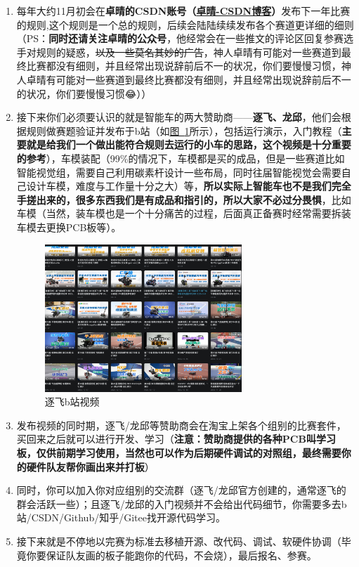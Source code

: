 \documentclass[a4paper,12pt]{article}
\newcommand{\emoji}[1]{{\EmojiFont #1}}
\begin{document}
\begin{enumerate}
    \item 每年大约11月初会在\textbf{卓晴的CSDN账号（\href{https://zhuoqing.blog.csdn.net/}{卓晴-CSDN博客}）}发布下一年比赛的规则,这个规则是一个总的规则，后续会陆陆续续发布各个赛道更详细的细则（PS：\textbf{同时还请关注卓晴的公众号}，他经常会在一些推文的评论区回复参赛选手对规则的疑惑，\sout{以及一些莫名其妙的广告}，神人卓晴有可能对一些赛道到最终比赛都没有细则，并且经常出现说辞前后不一的状况，你们要慢慢习惯，神人卓晴有可能对一些赛道到最终比赛都没有细则，并且经常出现说辞前后不一的状况，你们要慢慢习惯\emoji{😂}））

    \item 接下来你们必须要认识的就是智能车的两大赞助商——\textbf{逐飞、龙邱}，他们会根据规则做赛题验证并发布于b站（如\hyperref[fig:seekfree-bilibili]{图~\ref*{fig:seekfree-bilibili}}所示），包括运行演示，入门教程（\textbf{主要就是给我们一个做出能符合规则去运行的小车的思路，这个视频是十分重要的参考}），车模装配（99\%的情况下，车模都是买的成品，但是一些赛道比如智能视觉组，需要自己利用碳素杆设计一些布局，同时往届智能视觉会需要自己设计车模，难度与工作量十分之大）等，\textbf{所以实际上智能车也不是我们完全手搓出来的，很多东西我们是有成品和指引的，所以大家不必过分畏惧}，比如车模（当然，装车模也是一个十分痛苦的过程，后面真正备赛时经常需要拆装车模去更换PCB板等）。

    \begin{figure}[h]
    \centering
    \includegraphics[width=0.7\textwidth]{images/image-20250930200757938.png}
    \caption{逐飞b站视频}
    \label{fig:seekfree-bilibili}
    \end{figure}

    \item 发布视频的同时期，逐飞/龙邱等赞助商会在淘宝上架各个组别的比赛套件，买回来之后就可以进行开发、学习（\textbf{注意：赞助商提供的各种PCB叫学习板，仅供前期学习使用，当然也可以作为后期硬件调试的对照组，最终需要你的硬件队友帮你画出来并打板}）

    \item 同时，你可以加入你对应组别的交流群（逐飞/龙邱官方创建的，通常逐飞的群会活跃一些）；且逐飞/龙邱的入门视频并不会给出代码细节，你需要多去b站/CSDN/Github/知乎/Gitee找开源代码学习。

    \item 接下来就是不停地以完赛为标准去移植开源、改代码、调试、软硬件协调（毕竟你要保证队友画的板子能跑你的代码，不会烧），最后报名、参赛。
\end{enumerate}
\end{document}
